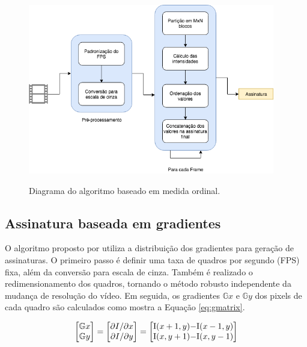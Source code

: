 \begin{figure}[!htb]
      \centering
      \caption{Diagrama do algoritmo baseado em medida ordinal.}
      \includegraphics[width=0.96\textwidth]{dados/figuras/diagramas/Diag-MO}
       	\label{fig:dia_ordinal}
    \end{figure}  

%
%


\subsection{Assinatura baseada em gradientes}
\label{sec:gradientes}

	O algoritmo proposto por  utiliza a distribuição dos gradientes para geração de assinaturas. O primeiro passo é definir uma taxa de quadros por segundo (FPS) fixa, além da conversão para escala de cinza. Também é realizado o redimensionamento dos quadros, tornando o método robusto independente da mudança de resolução do vídeo. Em seguida, os gradientes $\mathbb{G}x$ e $\mathbb{G}y$ dos pixels de cada quadro são calculados como mostra a Equação \ref{eq:gmatrix}.

\begin{equation}
  \label{eq:gmatrix}
  \begin{bmatrix}
    \mathbb{G}x
    \\ 
    \mathbb{G}y
  \end{bmatrix}= 
  \begin{bmatrix}
    \partial I/\partial x
    \\ 
    \partial I/\partial y
  \end{bmatrix}=
  \begin{bmatrix}
    $I$(x+1, y) - $I$(x-1,y)
    \\ 
    $I$(x, y+1) - $I$(x,y-1)
  \end{bmatrix}
\end{equation}
    
